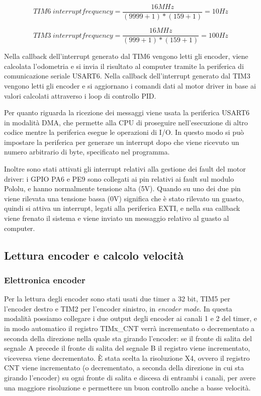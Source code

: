 \begin{displaymath}
TIM6 \; interrupt frequency = \frac{16 MHz}{(9999 + 1)*(159 + 1)} = 10 Hz
\end{displaymath}

\begin{displaymath}
TIM3 \; interrupt frequency = \frac{16 MHz}{(999 + 1)*(159 + 1)} = 100 Hz
\end{displaymath}

Nella callback dell'interrupt generato dal TIM6 vengono letti gli encoder, viene calcolata l'odometria e si invia il risultato al computer tramite la periferica di comunicazione seriale USART6.
Nella callback dell'interrupt generato dal TIM3 vengono letti gli encoder e si aggiornano i comandi dati al motor driver in base ai valori calcolati attraverso i loop di controllo PID.

Per quanto riguarda la ricezione dei messaggi viene usata la periferica USART6 in modalità DMA, che permette alla CPU di proseguire nell'esecuzione di altro codice mentre la periferica esegue le operazioni di I/O. In questo modo si può impostare la periferica per generare un interrupt dopo che viene ricevuto un numero arbitrario di byte, specificato nel programma.

Inoltre sono stati attivati gli interrupt relativi alla gestione dei fault del motor driver: i GPIO PA6 e PE9 sono collegati ai pin relativi ai fault sul modulo Pololu, e hanno normalmente tensione alta (5V). Quando su uno dei due pin viene rilevata una tensione bassa (0V) significa che è stato rilevato un guasto, quindi si attiva un interrupt, legati alla periferica EXTI, e nella sua callback viene frenato il sistema e viene inviato un messaggio relativo al guasto al computer.

\subsection{Lettura encoder e calcolo velocità}

\subsubsection{Elettronica encoder}

Per la lettura degli encoder sono stati usati due timer a 32 bit, TIM5 per l'encoder destro e TIM2 per l'encoder sinistro, in \textit{encoder mode}.
In questa modalità possiamo collegare i due output degli encoder ai canali 1 e 2 del timer, e in modo automatico il registro TIMx\_CNT verrà incrementato o decrementato a seconda della direzione nella quale sta girando l'encoder: se il fronte di salita del segnale A precede il fronte di salita del segnale B il registro viene incrementato, viceversa viene decrementato. È stata scelta la risoluzione X4, ovvero il registro CNT viene incrementato (o decrementato, a seconda della direzione in cui sta girando l'encoder) su ogni fronte di salita e discesa di entrambi i canali, per avere una maggiore risoluzione e permettere un buon controllo anche a basse velocità.

